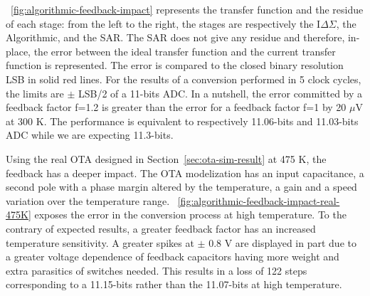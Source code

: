\figurename~\ref{fig:algorithmic-feedback-impact} represents the transfer function and the residue of each stage: from the left to the right, the stages are respectively the I\(\Delta\Sigma\), the Algorithmic, and the SAR\@. The SAR does not give any residue and therefore, in-place, the error between the ideal transfer function and the current transfer function is represented. The error is compared to the closed binary resolution LSB in solid red lines. For the results of a conversion performed in 5 clock cycles, the limits are $\pm$ LSB/2 of a 11-bits ADC\@. In a nutshell, the error committed by a feedback factor f=1.2 is greater than the error for a feedback factor f=1 by 20 $\mu$V at 300 K. The performance is equivalent to respectively 11.06-bits and 11.03-bits ADC while we are expecting 11.3-bits.

Using the real OTA designed in Section~\ref{sec:ota-sim-result} at 475 K, the feedback has a deeper impact. The OTA modelization has an input capacitance, a second pole with a phase margin altered by the temperature, a gain and a speed variation over the temperature range. \figurename~\ref{fig:algorithmic-feedback-impact-real-475K} exposes the error in the conversion process at high temperature. To the contrary of expected results, a greater feedback factor has an increased temperature sensitivity. A greater spikes at $\pm$ 0.8 V are displayed in part due to a greater voltage dependence of feedback capacitors having more weight and extra parasitics of switches needed. This results in a loss of 122 steps corresponding to a 11.15-bits rather than the 11.07-bits at high temperature.

